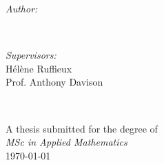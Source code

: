 \documentclass[a4paper, 11pt]{report}
\numberwithin{equation}{chapter}
\begin{document}
\begin{titlepage}
\begin{minipage}{0.4\textwidth}
\begin{flushleft} \large
\emph{Author:}\\
\@author %
\end{flushleft}
\end{minipage}
~
\begin{minipage}{0.4\textwidth}
\begin{flushright} \large
\emph{Supervisors:} \\
Hélène Ruffieux\\
Prof. Anthony Davison 
\end{flushright}
\end{minipage}\\[3cm]
\makeatother



{\large A thesis submitted for the degree of}\\[0.5cm]
{\large \emph{MSc in Applied Mathematics}}\\[0.5cm]
{\large \today}\\[2cm] %

\vfill %

\end{titlepage}
\end{document}
